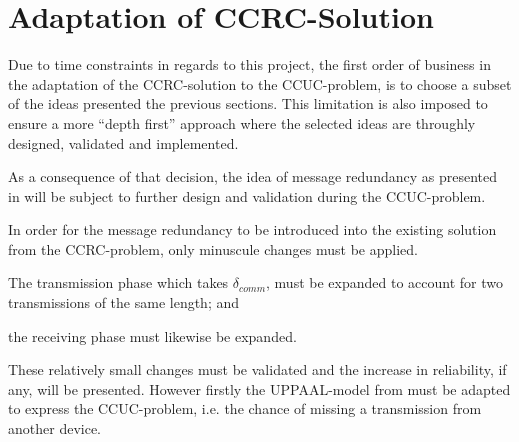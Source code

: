 \section{Adaptation of CCRC-Solution} %
\label{sec:adaptation_of_ccrc_solution}
Due to time constraints in regards to this project, the first order of business in the adaptation of the CCRC-solution to the CCUC-problem, is to choose a subset of the ideas presented the previous sections.
This limitation is also imposed to ensure a more ``depth first'' approach where the selected ideas are throughly designed, validated and implemented.

As a consequence of that decision, the idea of message redundancy as presented in  will be subject to further design and validation during the CCUC-problem.

In order for the message redundancy to be introduced into the existing solution from the CCRC-problem, only minuscule changes must be applied.
\begin{enumberate}
    \item The transmission phase which takes $\delta_{comm}$, must be expanded to account for two transmissions of the same length; and
    \item the receiving phase must likewise be expanded.
\end{enumberate}
These relatively small changes must be validated and the increase in reliability, if any, will be presented.
However firstly the UPPAAL-model from  must be adapted to express the CCUC-problem, i.e. the chance of missing a transmission from another device.

